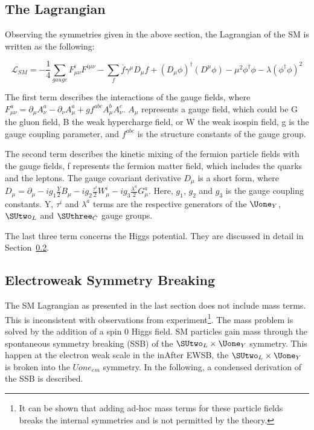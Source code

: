 \subsection{The Lagrangian}

Observing the symmetries given in the above section, the Lagrangian of the SM is written as the following:

\begin{equation}
    \mathcal{L}_{SM}= - \frac{1}{4} \sum\limits_{gauge} F^{i}_{\mu \nu}F^{i\mu\nu} - \sum\limits_{f} \overline{f} \gamma^{\mu} D_{\mu} f +(D_{\mu}\phi)^{\dagger}(D^{\mu}\phi) - \mu^{2}\phi^{\dagger}\phi - \lambda(\phi^{\dagger}\phi)^{2}
    \label{eq:SMLagrangian}
\end{equation}

The first term describes the interactions of the gauge fields, where $F^{a}_{\mu\nu}=\partial_{\mu}A_{\nu}^{a}-\partial_{\nu}A_{\mu}^{a}+g f^{abc}A^{b}_{\mu}A^{c}_{\nu}$. $A_{\mu}$ represents a gauge field, which could be G the gluon field, B the weak hypercharge field, or W the weak isospin field, g is the gauge coupling parameter, and $f^{abc}$ is the structure constants of the gauge group. 

The second term describes the kinetic mixing of the fermion particle fields with the gauge fields, f represents the fermion matter field, which includes the quarks and the leptons. The gauge covariant derivative $D_{\mu}$ is a short form, where $D_{\mu}=\partial_{\mu}-i g_{1} \frac{Y}{2}B_{\mu} - i g_{2}\frac{\tau ^{i}}{2}W_{\mu}^{i} - ig_{3}\frac{\lambda^{a}}{2}G^{a}_{\mu}$. Here, $g_{1}$, $g_{2}$ and $g_{3}$ is the gauge coupling constants. Y, $\tau ^{i}$ and $\lambda^{a}$ terms are the respective generators of the $\Uone_{Y}$, $\SUtwo_{L}$ and $\SUthree_{C}$ gauge groups.

The last three term concerns the Higgs potential. They are discussed in detail in Section~\ref{sec:SSB}.

\subsection{Electroweak Symmetry Breaking}
\label{sec:SSB}
The SM Lagrangian as presented in the last section does not include mass terms. This is inconsistent with observations from experiment\footnote{It can be shown that adding ad-hoc mass terms for these particle fields breaks the internal symmetries and is not permitted by the theory.}. The mass problem is solved by the addition of a spin 0 Higgs field\cite{higgs1964broken}. SM particles gain mass through the spontaneous symmetry breaking (SSB) of the $\SUtwo_{L} \times \Uone_{Y}$ symmetry. This happen at the electron weak scale in the inAfter EWSB, the $\SUtwo_{L} \times \Uone_{Y}$ is broken into the $Uone_{em}$ symmetry. In the following, a condensed derivation of the SSB is described\cite{peskin2018introduction}.

